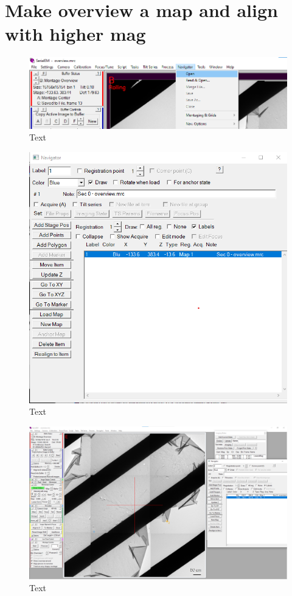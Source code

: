 \documentclass[12pt, a4paper]{scrartcl}
\begin{document}
\section{Make overview a map and align with higher mag}


\begin{figure}[H]
\includegraphics[width=\linewidth]{screenshots/OpenNavigator.png}
\caption{Text}
\end{figure}


\begin{figure}[H]
\includegraphics[scale=1]{screenshots/Navigator_addOverview.png}
\caption{Text}
\end{figure}

\begin{figure}[H]
\includegraphics[width=\linewidth]{screenshots/PointOnLandmark.png}
\caption{Text}
\end{figure}
\end{document}

